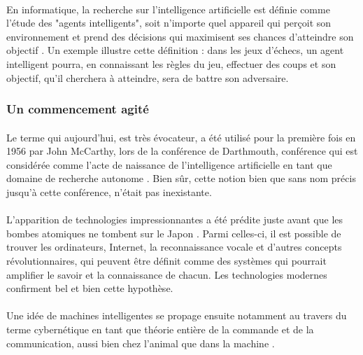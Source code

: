 \documentclass[10pt, french, a4paper]{article}
\begin{document}
\paragraph{}
En informatique, la recherche sur l’intelligence artificielle est définie comme l’étude des "agents intelligents", soit n’importe quel appareil qui perçoit son environnement et prend des décisions qui maximisent ses chances d’atteindre son objectif \citep{poole_computational_1997}. Un exemple illustre cette définition : dans les jeux d’échecs, un agent intelligent pourra, en connaissant les règles du jeu, effectuer des coups et son objectif, qu’il cherchera à atteindre, sera de battre son adversaire.

\subsubsection{Un commencement agité}

\paragraph{}
Le terme qui aujourd’hui, est très évocateur, a été utilisé pour la première fois en 1956 par John McCarthy, lors de la conférence de Darthmouth, conférence qui est considérée comme l’acte de naissance de l’intelligence artificielle en tant que domaine de recherche autonome \citep{solomonoff_time_1985}. Bien sûr, cette notion bien que sans nom précis jusqu’à cette conférence, n’était pas inexistante.

\paragraph{}
L’apparition de technologies impressionnantes a été prédite juste avant que les bombes atomiques ne tombent sur le Japon \citep{bush_as_1945}. Parmi celles-ci, il est possible de trouver les ordinateurs, Internet, la reconnaissance vocale et d’autres concepts révolutionnaires, qui peuvent être définit comme des systèmes qui pourrait amplifier le savoir et la connaissance de chacun. Les technologies modernes confirment bel et bien cette hypothèse.

\paragraph{}
Une idée de machines intelligentes se propage ensuite notamment au travers du terme cybernétique en tant que théorie entière de la commande et de la communication, aussi bien chez l’animal que dans la machine \citep{wiener_cybernetics;_1961}.
\end{document}
